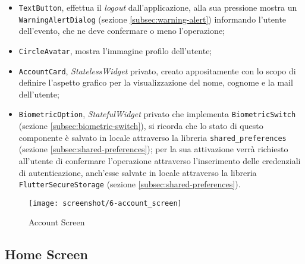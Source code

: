 \begin{itemize}
    \item \lstinline{TextButton}\cite{site:text-button}, effettua il \emph{logout} dall'applicazione, alla sua pressione mostra un \lstinline{WarningAlertDialog} (sezione \ref{subsec:warning-alert}) informando l'utente dell'evento, che ne deve confermare o meno l'operazione;
    \item \lstinline{CircleAvatar}\cite{site:circle-avatar}, mostra l'immagine profilo dell'utente;
    \item \lstinline{AccountCard}, \emph{StatelessWidget} privato, creato appositamente con lo scopo di definire l'aspetto grafico per la visualizzazione del nome, cognome e la mail dell'utente;
    \item \lstinline{BiometricOption}, \emph{StatefulWidget} privato che implementa \lstinline{BiometricSwitch} (sezione \ref{subsec:biometric-switch}), si ricorda che lo stato di questo componente è salvato in locale attraverso la libreria \lstinline{shared_preferences}\cite{site:shared-preferences} (sezione \ref{subsec:shared-preferences}); per la sua attivazione verrà richiesto all'utente di confermare l'operazione attraverso l'inserimento delle credenziali di autenticazione, anch'esse salvate in locale attraverso la libreria \lstinline{FlutterSecureStorage}\cite{site:flutter-secure-storage} (sezione \ref{subsec:shared-preferences}).
\end{itemize}

\begin{figure}[!h] 
    \centering 
    \texttt{[image: screenshot/6-account\_screen]} 
    \caption{Account Screen}
    \label{fig:account-screen}
\end{figure}

\subsection{Home Screen}
\label{subsec:home-screen}

